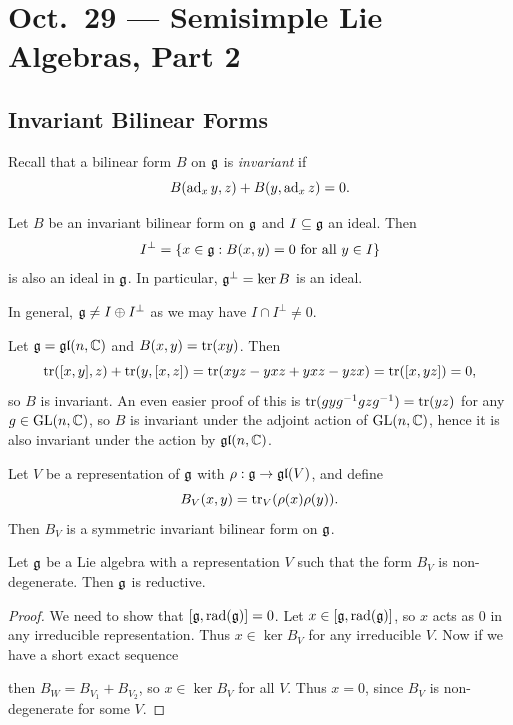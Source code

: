 \chapter{Oct.~29 --- Semisimple Lie Algebras, Part 2}

\section{Invariant Bilinear Forms}

\begin{definition}
  Recall that a bilinear form $B$
  on $\mathfrak{g}$ is \emph{invariant} if
  \[
    B(\operatorname{ad}_x y, z) + B(y, \operatorname{ad}_x z) = 0.
  \]
\end{definition}

\begin{lemma}
  Let $B$ be an invariant bilinear
  form on $\mathfrak{g}$
  and $I \subseteq \mathfrak{g}$ an ideal. Then
  \[
    I^\perp
    = \{x \in \mathfrak{g} : B(x, y) = 0 \text{ for all } y \in I\}
  \]
  is also an ideal in $\mathfrak{g}$. In particular,
  $\mathfrak{g}^\perp = \ker B$ is an ideal.
\end{lemma}

\begin{remark}
  In general,
  $\mathfrak{g} \ne I \oplus I^\perp$ as we may
  have $I \cap I^\perp \ne 0$.
\end{remark}

\begin{example}
  Let $\mathfrak{g} = \mathfrak{gl}(n, \mathbb{C})$
  and $B(x, y) = \operatorname{tr}(xy)$. Then
  \[
    \operatorname{tr}([x, y], z)
    + \operatorname{tr}(y, [x, z])
    = \operatorname{tr}(xyz - yxz + yxz - yzx)
    = \operatorname{tr}([x, yz]) = 0,
  \]
  so $B$ is invariant. An even easier
  proof of this is $\operatorname{tr}(gyg^{-1} gzg^{-1}) = \operatorname{tr}(yz)$
  for any $g \in \operatorname{GL}(n, \mathbb{C})$, so
  $B$ is invariant under the adjoint
  action of $\operatorname{GL}(n, \mathbb{C})$, hence it is
  also invariant under the action by $\mathfrak{gl}(n, \mathbb{C})$.
\end{example}

\begin{prop}
  Let $V$ be a representation
  of $\mathfrak{g}$ with $\rho : \mathfrak{g} \to \mathfrak{gl}(V)$, and
  define
  \[
    B_V(x, y) = \operatorname{tr}_V(\rho(x) \rho(y)).
  \]
  Then $B_V$ is a symmetric invariant
  bilinear form on $\mathfrak{g}$.
\end{prop}

\begin{theorem}
  Let $\mathfrak{g}$ be a Lie algebra with
  a representation $V$ such that
  the form $B_V$ is non-degenerate.
  Then $\mathfrak{g}$ is reductive.
\end{theorem}

\begin{proof}
  We need to show that
  $[\mathfrak{g}, \operatorname{rad}(\mathfrak{g})] = 0$.
  Let $x \in [\mathfrak{g}, \operatorname{rad}(\mathfrak{g})]$, so
  $x$ acts as $0$ in any irreducible
  representation. Thus
  $x \in \ker B_V$ for any
  irreducible $V$. Now if we have a
  short exact sequence
  \begin{center}
  \end{center}
  then $B_W = B_{V_1} + B_{V_2}$, so
  $x \in \ker B_V$ for all $V$.
  Thus $x = 0$, since $B_V$ is
  non-degenerate for some $V$.
\end{proof}

